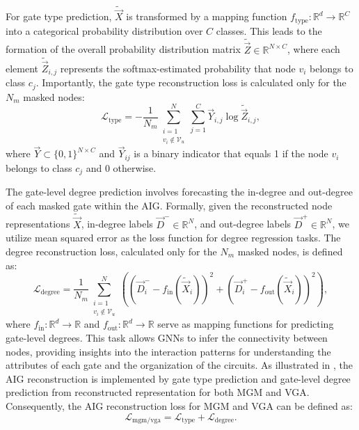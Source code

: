 For gate type prediction, $\tilde{\Vec{X}}$ is transformed by a mapping function $f_{\text{type}}: \mathbb{R}^{d} \rightarrow \mathbb{R}^{C}$ into a categorical probability distribution over $C$ classes.
This leads to the formation of the overall probability distribution matrix $\tilde{\Vec{Z}} \in \mathbb{R}^{N \times C}$, where each element $\tilde{\Vec{Z}}_{i,j}$ represents the softmax-estimated probability that node $v_i$ belongs to class $c_j$.
Importantly, the gate type reconstruction loss is calculated only for the $N_m$ masked nodes:
\begin{equation}
\mathcal{L}_{\text{type}} = -\frac{1}{N_m} \sum_{\substack{i=1 \\ v_i \notin \mathcal{V}_u}}^{N} \sum_{j=1}^{C} \Vec{Y}_{i,j} \log \tilde{\Vec{Z}}_{i,j},
\end{equation}
where $\Vec{Y} \subset \{0, 1\}^{N \times C}$ and $\Vec{Y}_{ij}$ is a binary indicator that equals 1 if the node $v_{i}$ belongs to class $c_j$ and 0 otherwise.

The gate-level degree prediction involves forecasting the in-degree and out-degree of each masked gate within the AIG. 
Formally, given the reconstructed node representations $\tilde{\Vec{X}}$, in-degree labels $\Vec{D}^{-} \in \mathbb{R}^{N}$, and out-degree labels $\Vec{D}^{+} \in \mathbb{R}^{N}$, we utilize mean squared error as the loss function for degree regression tasks. The degree reconstruction loss, calculated only for the $N_m$ masked nodes, is defined as:
\begin{equation}
    \mathcal{L}_{\text{degree}} = \frac{1}{N_m} \sum_{\substack{i=1 \\ v_i \notin \mathcal{V}_u}}^{N} \left( (\Vec{D}_{i}^{-} - f_{\text{in}}(\tilde{\Vec{X}}_{i}))^2 + (\Vec{D}_{i}^{+} - f_{\text{out}}(\tilde{\Vec{X}}_{i}))^2 \right),
\end{equation}
where $f_{\text{in}}: \mathbb{R}^{d} \rightarrow \mathbb{R}$ and $f_{\text{out}}: \mathbb{R}^{d} \rightarrow \mathbb{R}$ serve as mapping functions for predicting gate-level degrees. 
This task allows GNNs to infer the connectivity between nodes, providing insights into the interaction patterns for understanding the attributes of each gate and the organization of the circuits.
As illustrated in , the AIG reconstruction is implemented by gate type prediction and gate-level degree prediction from reconstructed representation for both MGM and VGA. 
Consequently, the AIG reconstruction loss for MGM and VGA can be defined as:
\begin{equation}
	\mathcal{L}_{\text{mgm}/\text{vga}} = \mathcal{L}_{\text{type}} + \mathcal{L}_{\text{degree}}.
\end{equation}

